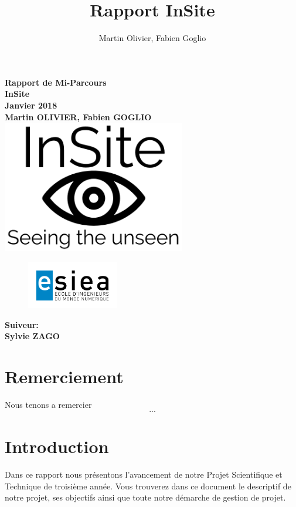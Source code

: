 \documentclass[a4paper, 12pt, titlepage, oneside, french]{article}
\author{Martin Olivier, Fabien Goglio}
\title{Rapport InSite}
\begin{document}
\begin{titlepage}
	\centering
		\vfill
		    {\bfseries\Large
			Rapport de Mi-Parcours\\
			InSite\\
			Janvier 2018\\
			\vskip2cm
			Martin OLIVIER, Fabien GOGLIO\\
		    }    
		\vfill
		\includegraphics[width=8cm]{Logo_Preview.png}
		\begin{figure}[b]
			\includegraphics[width=4cm]{Logo-ESIEA.jpg}

		\end{figure}
		\vfill
		\hfill {\bfseries\Large
		 Suiveur:\\
		 \hfill Sylvie ZAGO}
\end{titlepage}

\newpage
	\tableofcontents
\newpage
\cleardoublepage
\setcounter{page}{1} %
\section{Remerciement}
	Nous tenons a remercier \[...\]
	\newpage
\section{Introduction}
	Dans ce rapport nous présentons l'avancement de notre Projet Scientifique et Technique de troisième année.
	Vous trouverez dans ce document le descriptif de notre projet, ses objectifs ainsi que toute notre démarche de gestion de projet.

	\paragraph{}
\end{document}
